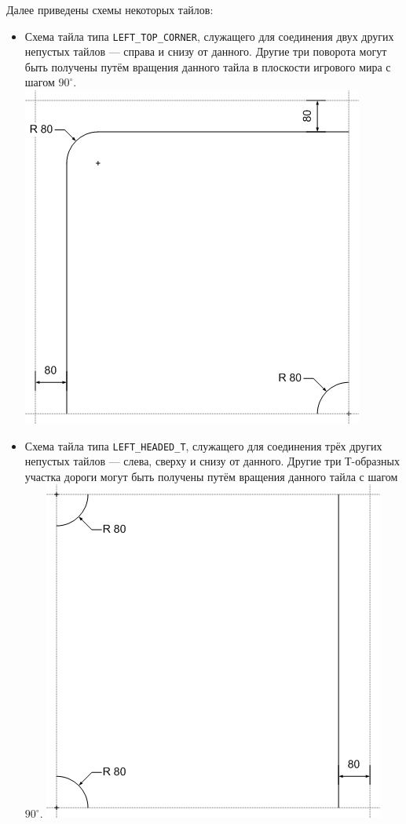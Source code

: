 Далее приведены схемы некоторых тайлов:
\begin{itemize}
\newpage
\item Схема тайла типа \texttt{LEFT\_TOP\_CORNER}, служащего для соединения двух других непустых тайлов --- справа и снизу от данного.
Другие три поворота могут быть получены путём вращения данного тайла в плоскости игрового мира с шагом $90^\circ$.
\includegraphics{images/tiles/LeftTopCorner.png}

\newpage
\item Схема тайла типа \texttt{LEFT\_HEADED\_T}, служащего для соединения трёх других непустых тайлов --- слева, сверху и снизу от данного.
Другие три Т-образных участка дороги могут быть получены путём вращения данного тайла с шагом $90^\circ$.
\includegraphics{images/tiles/LeftHeadedT.png}


\end{itemize}
